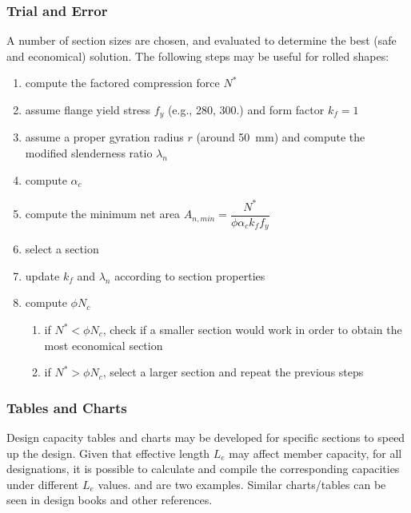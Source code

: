 \subsubsection{Trial and Error}
A number of section sizes are chosen, and evaluated to determine the best (safe and economical) solution. The following steps may be useful for rolled shapes:
\begin{enumerate}
\item compute the factored compression force $N^*$
\item assume flange yield stress $f_y$ (e.g., \SI{280}{\mpa}, \SI{300}{\mpa}.) and form factor $k_f=1$
\item assume a proper gyration radius $r$ (around \SI{50}{\mm}) and compute the modified slenderness ratio $\lambda_n$
\item compute $\alpha_c$
\item compute the minimum net area $A_{n,min}=\dfrac{N^*}{\phi\alpha_ck_ff_y}$
\item select a section
\item update $k_f$ and $\lambda_n$ according to section properties
\item compute $\phi{}N_c$
\begin{enumerate}
\item if $N^*<\phi{}N_c$, check if a smaller section would work in order to obtain the most economical section
\item if $N^*>\phi{}N_c$, select a larger section and repeat the previous steps
\end{enumerate}
\end{enumerate}
\subsubsection{Tables and Charts}
Design capacity tables and charts may be developed for specific sections to speed up the design. Given that effective length $L_e$ may affect member capacity, for all designations, it is possible to calculate and compile the corresponding capacities under different $L_e$ values.  and  are two examples. Similar charts/tables can be seen in design books and other references.


